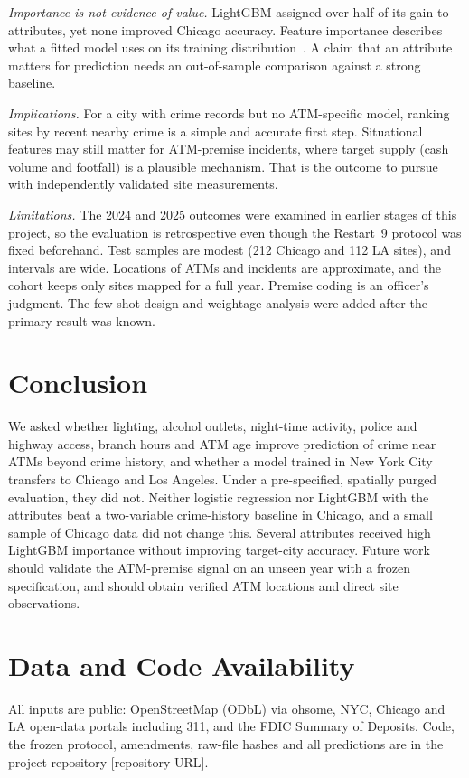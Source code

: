 \documentclass[conference]{IEEEtran}
\begin{document}
\textit{Importance is not evidence of value.} LightGBM assigned over half of its gain to attributes, yet none improved
Chicago accuracy. Feature importance describes what a fitted model uses on its training distribution~\cite{strobl2007}.
A claim that an attribute matters for prediction needs an out-of-sample comparison against a strong baseline.

\textit{Implications.} For a city with crime records but no ATM-specific model, ranking sites by recent nearby crime is
a simple and accurate first step. Situational features may still matter for ATM-premise incidents, where target
supply (cash volume and footfall) is a plausible mechanism. That is the outcome to pursue with independently
validated site measurements.

\textit{Limitations.} The 2024 and 2025 outcomes were examined in earlier stages of this project, so the evaluation
is retrospective even though the Restart~9 protocol was fixed beforehand. Test samples are modest (212 Chicago and
112 LA sites), and intervals are wide. Locations of ATMs and incidents are approximate, and the cohort keeps only
sites mapped for a full year. Premise coding is an officer's judgment. The few-shot design and weightage analysis
were added after the primary result was known.

\section{Conclusion}
We asked whether lighting, alcohol outlets, night-time activity, police and highway access, branch hours and ATM age
improve prediction of crime near ATMs beyond crime history, and whether a model trained in New York City transfers
to Chicago and Los Angeles. Under a pre-specified, spatially purged evaluation, they did not. Neither logistic
regression nor LightGBM with the attributes beat a two-variable crime-history baseline in Chicago, and a small
sample of Chicago data did not change this. Several attributes received high LightGBM importance without improving
target-city accuracy. Future work should validate the ATM-premise signal on an unseen year with a frozen
specification, and should obtain verified ATM locations and direct site observations.

\section*{Data and Code Availability}
All inputs are public: OpenStreetMap (ODbL) via ohsome, NYC, Chicago and LA open-data portals including 311, and the
FDIC Summary of Deposits. Code, the frozen protocol, amendments, raw-file hashes and all predictions are in the
project repository [repository URL].
\end{document}
